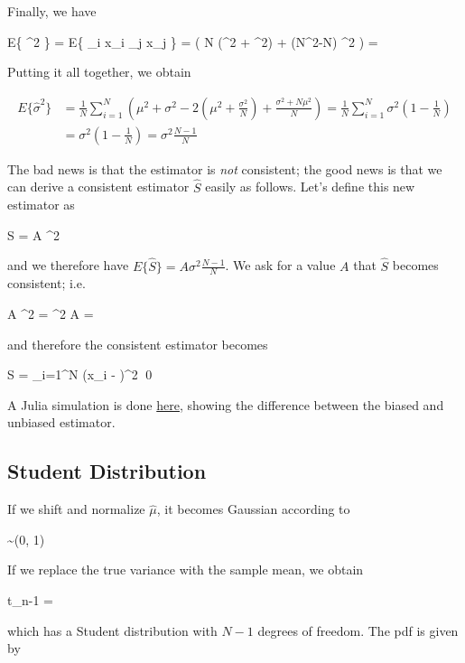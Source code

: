 Finally, we have

\bee
E\left\{ \hat\mu^2 \right\} = E\left\{  \sum_i x_i \sum_j x_j \right\} =  \left( N (\mu^2 + \sigma^2) + (N^2-N) \mu^2 \right) = 
\eee

Putting it all together, we obtain

\begin{align*}
E\{\hat\sigma^2\} &= \frac{1}{N} \sum_{i=1}^N \left( \mu^2 + \sigma^2 - 2 \left( \mu^2 + \frac{\sigma^2}{N} \right) + \frac{\sigma^2 + N \mu^2}{N} \right) = \frac{1}{N} \sum_{i=1}^N \sigma^2 \left(1 - \frac{1}{N} \right) \\ &= \sigma^2 \left(1 - \frac{1}{N} \right) = \sigma^2 \frac{N-1}{N}
\end{align*}

The bad news is that the estimator is \emph{not} consistent; the good news is that we can derive a consistent estimator $\hat S$ easily as follows. Let's define this new estimator as

\bee
\hat S = A \hat \sigma^2
\eee

and we therefore have $E\{\hat S\} = A \sigma^2 \frac{N-1}{N}$. We ask for a value $A$ that $\hat S$ becomes consistent; i.e.

\bee
A \sigma^2  = \sigma^2 \rightarrow A = 
\eee

and therefore the consistent estimator becomes

\be\label{2019-07-04:eq2}
\hat S =  \sum_{i=1}^N (x_i - \hat\mu)^2 \qed
\ee

A Julia simulation is done \href{https://github.com/ClemensFMN/JuliaStuff/blob/master/stochastic/student_0.jl}{here}, showing the difference between the biased and unbiased estimator.


\subsection{Student Distribution}

If we shift and normalize $\hat \mu$, it becomes Gaussian according to

\bee
{} \sim \Nc(0, 1)
\eee

If we replace the true variance with the sample mean, we obtain

\bee
t_{n-1} = 
\eee

which has a Student distribution with $N-1$ degrees of freedom. The pdf is given by

